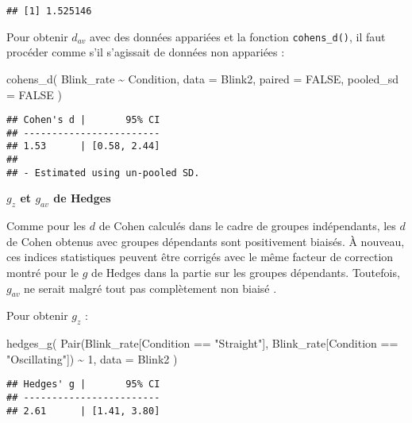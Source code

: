 \documentclass[
]{book}
\newenvironment{Shaded}{\begin{snugshade}}{\end{snugshade}}
\newcommand{\AttributeTok}[1]{\textcolor[rgb]{0.77,0.63,0.00}{#1}}
\newcommand{\ConstantTok}[1]{\textcolor[rgb]{0.00,0.00,0.00}{#1}}
\newcommand{\DecValTok}[1]{\textcolor[rgb]{0.00,0.00,0.81}{#1}}
\newcommand{\FunctionTok}[1]{\textcolor[rgb]{0.00,0.00,0.00}{#1}}
\newcommand{\NormalTok}[1]{#1}
\newcommand{\SpecialCharTok}[1]{\textcolor[rgb]{0.00,0.00,0.00}{#1}}
\newcommand{\StringTok}[1]{\textcolor[rgb]{0.31,0.60,0.02}{#1}}
\begin{document}
\begin{verbatim}
## [1] 1.525146
\end{verbatim}

Pour obtenir \(d_{av}\) avec des données appariées et la fonction \texttt{cohens\_d()}, il faut procéder comme s'il s'agissait de données non appariées :

\begin{Shaded}
\begin{Highlighting}[]
\FunctionTok{cohens\_d}\NormalTok{(}
\NormalTok{  Blink\_rate }\SpecialCharTok{\textasciitilde{}}\NormalTok{ Condition,}
  \AttributeTok{data =}\NormalTok{ Blink2,}
  \AttributeTok{paired =} \ConstantTok{FALSE}\NormalTok{, }
  \AttributeTok{pooled\_sd =} \ConstantTok{FALSE}
\NormalTok{  )}
\end{Highlighting}
\end{Shaded}

\begin{verbatim}
## Cohen's d |       95% CI
## ------------------------
## 1.53      | [0.58, 2.44]
## 
## - Estimated using un-pooled SD.
\end{verbatim}

\textbf{\(g_{z}\) et \(g_{av}\) de Hedges}

Comme pour les \(d\) de Cohen calculés dans le cadre de groupes indépendants, les \(d\) de Cohen obtenus avec groupes dépendants sont positivement biaisés. À nouveau, ces indices statistiques peuvent être corrigés avec le même facteur de correction montré pour le \(g\) de Hedges dans la partie sur les groupes dépendants. Toutefois, \(g_{av}\) ne serait malgré tout pas complètement non biaisé \autocite{lakensCalculatingReportingEffect2013}.

Pour obtenir \(g_z\) :

\begin{Shaded}
\begin{Highlighting}[]
\FunctionTok{hedges\_g}\NormalTok{(}
  \FunctionTok{Pair}\NormalTok{(Blink\_rate[Condition }\SpecialCharTok{==} \StringTok{"Straight"}\NormalTok{], Blink\_rate[Condition }\SpecialCharTok{==} \StringTok{"Oscillating"}\NormalTok{]) }\SpecialCharTok{\textasciitilde{}} \DecValTok{1}\NormalTok{, }
  \AttributeTok{data =}\NormalTok{ Blink2}
\NormalTok{  )}
\end{Highlighting}
\end{Shaded}

\begin{verbatim}
## Hedges' g |       95% CI
## ------------------------
## 2.61      | [1.41, 3.80]
\end{verbatim}
\end{document}
